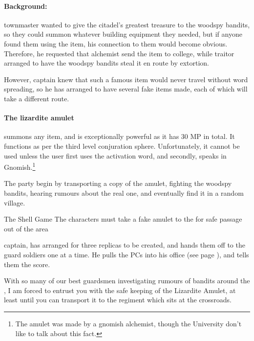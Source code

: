 \begin{multicols}{2}
\noindent
\paragraph{Background:}
\gls{townmaster} wanted to give the citadel's greatest treasure to the woodspy bandits, so they could summon whatever building equipment they needed, but if anyone found them using the item, his connection to them would become obvious.
Therefore, he requested that \gls{alchemist} send the item to \gls{college}, while \gls{traitor} arranged to have the woodspy bandits steal it en route by extortion.

However, \gls{captain} knew that such a famous item would never travel without word spreading, so he has arranged to have several fake items made, each of which will take a different route.

\paragraph{The lizardite amulet}
summons any item, and is exceptionally powerful as it has 30 MP in total.  It functions as per the third level conjuration sphere.  Unfortunately, it cannot be used unless the user first uses the activation word, and secondly, speaks in Gnomish.\footnote{The amulet was made by a gnomish alchemist, though the University don't like to talk about this fact.}


The party begin by transporting a copy of the amulet, fighting the woodspy bandits, hearing rumours about the real one, and eventually find it in a random village.

{The Shell Game}%
{The characters must take a fake amulet to the  for safe passage out of the area}%

\Gls{captain}, has arranged for three replicas to be created, and hands them off to the \gls{guard} soldiers one at a time.
He pulls the PCs into his office (see page \pageref{guardstation}), and tells them the score.

\begin{speechtext}

  With so many of our best guardsmen investigating rumours of bandits around the , I am forced to entrust you with the safe keeping of the Lizardite Amulet, at least until you can transport it to the regiment which sits at the crossroads.


\end{speechtext}
\end{multicols}
